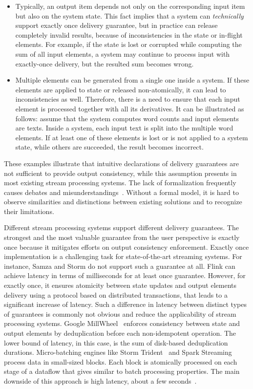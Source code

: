 \begin{itemize}
    \item Typically, an output item depends not only on the corresponding input item but also on the system state. This fact implies that a system can {\em technically} support exactly once delivery guarantee, but in practice can release completely invalid results, because of inconsistencies in the state or in-flight elements. For example, if the state is lost or corrupted while computing the sum of all input elements, a system may continue to process input with exactly-once delivery, but the resulted sum becomes wrong. 
    \item Multiple elements can be generated from a single one inside a system. If these elements are applied to state or released non-atomically, it can lead to inconsistencies as well. Therefore, there is a need to ensure that each input element is processed together with all its derivatives. It can be illustrated as follows: assume that the system computes word counts and input elements are texts. Inside a system, each input text is split into the multiple word elements. If at least one of these elements is lost or is not applied to a system state, while others are succeeded, the result becomes incorrect. 
\end{itemize}

These examples illustrate that intuitive declarations of delivery guarantees are not sufficient to provide output consistency, while this assumption presents in most existing stream processing systems. The lack of formalization frequently causes debates and misunderstandings~\cite{JerryPengStreamIO, PaperTrail}. Without a formal model, it is hard to observe similarities and distinctions between existing solutions and to recognize their limitations.

Different stream processing systems support different delivery guarantees. The strongest and the most valuable guarantee from the user perspective is exactly once because it mitigates efforts on output consistency enforcement. Exactly once implementation is a challenging task for state-of-the-art streaming systems. For instance, Samza and Storm do not support such a guarantee at all. Flink can achieve latency in terms of milliseconds for at least once guarantee. However, for exactly once, it ensures atomicity between state updates and output elements delivery using a protocol based on distributed transactions, that leads to a significant increase of latency. Such a difference in latency between distinct types of guarantees is commonly not obvious and reduce the applicability of stream processing systems. Google MillWheel~\cite{Akidau:2013:MFS:2536222.2536229} enforces consistency between state and output elements by deduplication before each non-idempotent operation. The lower bound of latency, in this case, is the sum of disk-based deduplication durations. Micro-batching engines like Storm Trident~\cite{apache:storm:trident} and Spark Streaming~\cite{Zaharia:2012:DSE:2342763.2342773} process data in small-sized blocks. Each block is atomically processed on each stage of a dataflow that gives similar to batch processing properties. The main downside of this approach is high latency, about a few seconds~\cite{7530084, 7474816}.

